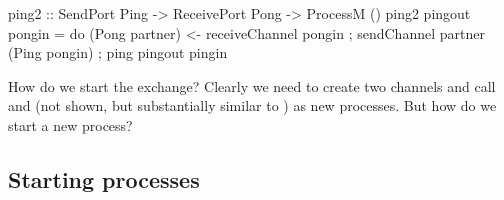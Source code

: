 \documentclass[preprint]{sigplanconf}
\begin{document}
\begin{code}
ping2 :: SendPort Ping -> ReceivePort Pong -> ProcessM ()
ping2 pingout pongin = 
   do { (Pong partner) <- receiveChannel pongin
      ; sendChannel partner (Ping pongin) 
      ; ping pingout pingin }
\end{code}

How do we start the exchange? Clearly we need to create two channels and call  and  (not shown, but substantially similar to ) as new processes. But how do we start a new process?

\subsection{Starting processes}
\end{document}
